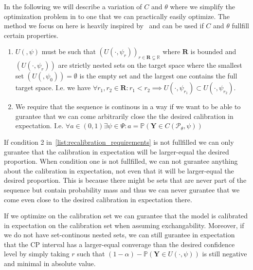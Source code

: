 In the following we will describe a variation of $C$ and $\theta$ where we simplify the optimization problem in  to one that we can practically easily optimize. The method we focus on here is heavily inspired by~\cite{sesia2021conformal} and can be used if $C$ and $\theta$ fullfill certain properties.

\begin{enumerate}\label{list:recalibration_requirements}
    \item $U(,\psi)$ must be such that $\left(U\left(\cdot, \psi_r\right)\right)_{r \in \mathbf{R} \subsetneq \mathbb{R}}$ where $\mathbf{R}$ is bounded and $(U(\cdot,\psi_r))$ are strictly nested sets on the target space where the smallest set $(U(,\psi_0)) = \emptyset$ is the empty set and the largest one contains the full target space. I.e. we have $\forall r_1, r_2 \in \mathbf{R}: r_1 < r_2 \implies U(\cdot,\psi_{r_1}) \subset U(\cdot, \psi_{r_2})$.
    \item We require that the sequence is continous in a way if we want to be able to gurantee that we can come arbitrarily close the the desired calibration in expectation. I.e. $\forall a\in(0,1) \exists \psi\in\Psi : a = \mathbb{P}(\mathbf{Y} \in C(\mathcal{P}_{\theta}, \psi))$
\end{enumerate}

If condition 2 in~\ref{list:recalibration_requirements} is not fullfilled we can only gurantee that the calibration in expectation will be larger-equal the desired proportion. When condition one is not fullfilled, we can not gurantee anything about the calibration in expectation, not even that it will be larger-equal the desired proportion. This is because there might be sets that are never part of the sequence but contain probability mass and thus we can never gurantee that we come even close to the desired calibration in expectation there.

If we optimize  on the calibration set we can gurantee that the model is calibrated in expectation on the calibration set when assuming exchangability. Moreover, if we do not have set-continous nested sets, we can still gurantee in expectation that the CP interval has a larger-equal converage than the desired confidence level by simply taking $r$ such that $(1 - \alpha) - \mathbb{P}(\mathbf{Y} \in U(\cdot, \psi))$ is still negative and minimal in absolute value.


